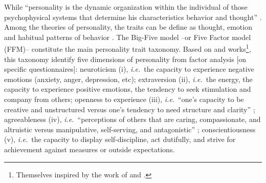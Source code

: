 \documentclass[a4paper, 11pt, onecolumn]{article}
\newcommand{\ie}{\textit{i.e.}}
\begin{document}
While ``personality is the dynamic organization within the individual of those psychophysical systems that determine his characteristics behavior and thought'' \citep{Allport1961}.
Among the theories of personality, the traits can be define as thought, emotion and habitual patterns of behavior \citep{Kassin2003}.
The Big-Five model --or Five Factor model (FFM)-- constitute the main personality trait taxonomy.
Based on \cite{Goldberg1981} and \cite{McCrae1987} works\footnote{Themselves inspired by the work of \cite{Cattell1943, Cattell1947} and \cite{Norman1963}.}, this taxonomy identify five dimensions of personality from factor analysis [on specific questionnaires]: neuroticism (i), \ie~the capacity to experience negative emotions (anxiety, anger, depression, etc); extraversion (ii), \ie~the energy, the capacity to experience positive emotions, the tendency to seek stimulation and company from others; openness to experience (iii), \ie~``one’s capacity to be creative and unstructured versus one’s tendency to need structure and clarity'' \citep{Piedmont2014}; agreeableness (iv), \ie~``perceptions of others that are caring, compassionate, and altruistic versus manipulative, self-serving, and antagonistic'' \citep{Piedmont2014}; conscientiousness (v), \ie~the capacity to display self-discipline, act dutifully, and strive for achievement against measures or outside expectations.
\end{document}
